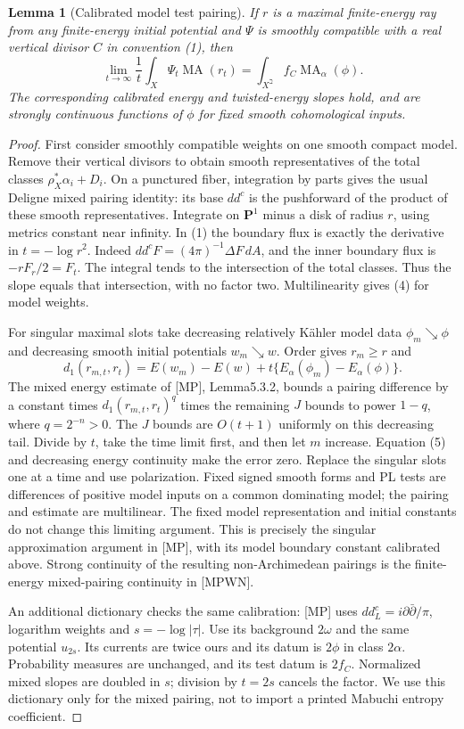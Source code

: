 \documentclass[11pt]{article}
\newcommand{\MA}{\operatorname{MA}}
\newtheorem{lemma}[theorem]{Lemma}
\begin{document}
\begin{lemma}[Calibrated model test pairing]
If $r$ is a maximal finite-energy ray from any finite-energy initial
potential and $\Psi$ is smoothly compatible with a real vertical
divisor $C$ in convention (1), then
\[
 \lim_{t\to\infty}\frac1t\int_X\Psi_t\MA(r_t)
     =\int_{X^\beth} f_C\MA_\alpha(\phi).                 \tag{4}
\]
The corresponding calibrated energy and twisted-energy slopes hold,
and are strongly continuous functions of $\phi$ for fixed smooth
cohomological inputs.
\end{lemma}
\begin{proof}
First consider smoothly compatible weights on one smooth compact
model. Remove their vertical divisors to obtain smooth representatives
of the total classes $\rho_X^*\alpha_i+D_i$. On a punctured fiber,
integration by parts gives the usual Deligne mixed pairing identity:
its base $dd^c$ is the pushforward of the product of these smooth
representatives. Integrate on $\mathbf P^1$ minus a disk of radius
$r$, using metrics constant near infinity. In (1) the boundary flux
is exactly the derivative in $t=-\log r^2$. Indeed
$dd^cF=(4\pi)^{-1}\Delta F\,dA$, and the inner boundary flux is
$-rF_r/2=F_t$. The integral tends to the intersection of the total
classes. Thus the slope equals that intersection, with no factor two.
Multilinearity gives (4) for model weights.

For singular maximal slots take decreasing relatively K\"ahler
model data $\phi_m\searrow\phi$ and decreasing smooth initial
potentials $w_m\searrow w$. Order gives $r_m\geq r$ and
\[
 d_1(r_{m,t},r_t)=E(w_m)-E(w)
                      +t\{E_\alpha(\phi_m)-E_\alpha(\phi)\}.
                                                               \tag{5}
\]
The mixed energy estimate of [MP], Lemma5.3.2, bounds a pairing
difference by a constant times $d_1(r_{m,t},r_t)^q$ times the
remaining $J$ bounds to power $1-q$, where $q=2^{-n}>0$.
The $J$ bounds are $O(t+1)$ uniformly on this decreasing tail.
Divide by $t$, take the time limit first, and then let $m$ increase.
Equation (5) and decreasing energy continuity make the error zero.
Replace the singular slots one at a time and use polarization.
Fixed signed smooth forms and PL tests are differences of positive
model inputs on a common dominating model; the pairing and estimate
are multilinear. The fixed model representation and initial constants
do not change this limiting argument. This is precisely the singular
approximation argument in [MP], with its model boundary constant
calibrated above. Strong continuity of the resulting non-Archimedean
pairings is the finite-energy mixed-pairing continuity in [MPWN].

An additional dictionary checks the same calibration: [MP] uses
$dd^c_L=i\partial\bar\partial/\pi$, logarithm weights and
$s=-\log|\tau|$. Use its background $2\omega$ and the same potential
$u_{2s}$. Its currents are twice ours and its datum is $2\phi$ in
class $2\alpha$. Probability measures are unchanged, and its test
datum is $2f_C$. Normalized mixed slopes are doubled in $s$;
division by $t=2s$ cancels the factor. We use this dictionary only for
the mixed pairing, not to import a printed Mabuchi entropy coefficient.
\end{proof}
\end{document}
